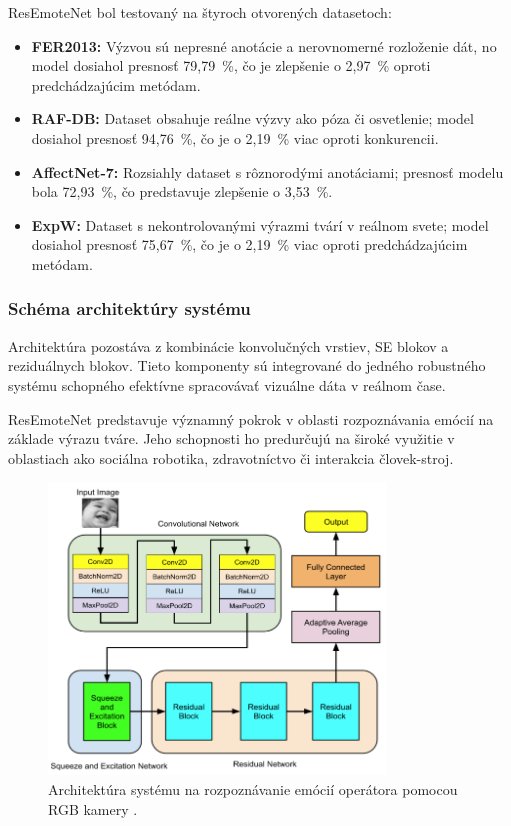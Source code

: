 ResEmoteNet bol testovaný na štyroch otvorených datasetoch:
\begin{itemize}
    \item \textbf{FER2013:} Výzvou sú nepresné anotácie a nerovnomerné rozloženie dát, no model dosiahol presnosť 79,79~\%, čo je zlepšenie o 2,97~\% oproti predchádzajúcim metódam.
    \item \textbf{RAF-DB:} Dataset obsahuje reálne výzvy ako póza či osvetlenie; model dosiahol presnosť 94,76~\%, čo je o 2,19~\% viac oproti konkurencii.
    \item \textbf{AffectNet-7:} Rozsiahly dataset s rôznorodými anotáciami; presnosť modelu bola 72,93~\%, čo predstavuje zlepšenie o 3,53~\%.
    \item \textbf{ExpW:} Dataset s nekontrolovanými výrazmi tvárí v reálnom svete; model dosiahol presnosť 75,67~\%, čo je o 2,19~\% viac oproti predchádzajúcim metódam.
\end{itemize}

\subsubsection{Schéma architektúry systému}

Architektúra pozostáva z kombinácie konvolučných vrstiev, SE blokov a reziduálnych blokov. Tieto komponenty sú integrované do jedného robustného systému schopného efektívne spracovávať vizuálne dáta v reálnom čase.

ResEmoteNet predstavuje významný pokrok v oblasti rozpoznávania emócií na základe výrazu tváre. Jeho schopnosti ho predurčujú na široké využitie v oblastiach ako sociálna robotika, zdravotníctvo či interakcia človek-stroj.

\begin{figure}[!htpb]
    \centering
    \includegraphics[width=0.8\textwidth]{img/architecture.png}
    \caption{Architektúra systému na rozpoznávanie emócií operátora pomocou RGB kamery \cite{misc01}.} 
    \label{fig:architecture}
\end{figure}
\newpage

